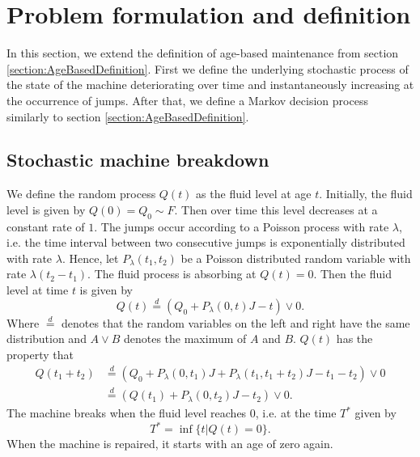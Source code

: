 \section{Problem formulation and definition}
In this section, we extend the definition of age-based maintenance from section \ref{section:AgeBasedDefinition}.
First we define the underlying stochastic process of the state of the machine deteriorating over time and instantaneously increasing at the occurrence of jumps.
After that, we define a Markov decision process similarly to section \ref{section:AgeBasedDefinition}.

\subsection{Stochastic machine breakdown}
We define the random process $Q(t)$ as the fluid level at age $t$.
Initially, the fluid level is given by $Q(0)=Q_0\sim F$.
Then over time this level decreases at a constant rate of $1$.
The jumps occur according to a Poisson process with rate $\lambda$, i.e. the time interval between two consecutive jumps is exponentially distributed with rate $\lambda$.
Hence, let $P_\lambda(t_1,t_2)$ be a Poisson distributed random variable with rate $\lambda (t_2-t_1)$.
The fluid process is absorbing at $Q(t)=0$.
Then the fluid level at time $t$ is given by 
\[
Q(t)\stackrel d=(Q_0+P_\lambda(0,t)J-t)\vee 0.
\]
Where $\stackrel d=$ denotes that the random variables on the left and right have the same distribution and $A\vee B$ denotes the maximum of $A$ and $B$.
$Q(t)$ has the property that
\[
\begin{split}
Q(t_1+t_2)&\stackrel d=( Q_0+P_\lambda(0,t_1)J+P_\lambda(t_1,t_1+t_2)J-t_1-t_2)\vee0\\
&\stackrel d= (Q(t_1)+P_\lambda(0,t_2)J-t_2)\vee0.
\end{split}
\]
The machine breaks when the fluid level reaches $0$, i.e. at the time $T^*$ given by
\[
T^*=\inf\{t|Q(t)=0\}.
\]
When the machine is repaired, it starts with an age of zero again.

